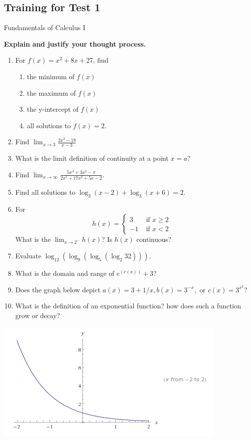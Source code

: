 \documentclass[a4paper, 12pt]{article}
\title{}
\date{}
\newcommand{\bt}[1]{\textbf{#1}} %
\begin{document}
\begin{center}
\section*{Training for Test 1}
Fundamentals of Calculus I\\
\end{center}

\bt{Explain and justify your thought process.}

\begin{enumerate}
    \item For $f(x) = x^2 + 8x +27$, find
    \begin{enumerate}
        \item the minimum of $f(x)$
        \item the maximum of $f(x)$
        \item the y-intercept of $f(x)$
        \item all solutions to $f(x) = 2$.
    \end{enumerate}

    \item Find $\lim_{x \rightarrow 3} \frac{2x^2-18}{x-3}$
    \item What is the limit definition of continuity at a point $x=a$?
    \item Find $\lim_{x \rightarrow \infty} \frac{5x^3 + 3x^2 -\pi}{2x^5 + 17x^2+ 5x -2}$.
    \item Find all solutions to $\log_3(x-2) + \log_3(x+6) =2$.
    \item For
        \begin{displaymath}
           h(x) = \left\{
             \begin{array}{lr}
               3 & \text{ if } x \geq 2 \\
              -1 & \text{ if } x < 2
             \end{array}
           \right.
        \end{displaymath} 
        What is the $\lim_{x \rightarrow 2^-} h(x) $? Is $h(x)$ continuous?
    \item Evaluate $\log_{12}(\log_9(\log_5(\log_2 32)))$.
    \item What is the domain and range of $e^{(e(x))} +3$?
    \item Does the graph below depict $a(x) = 3 + 1/x, b(x) = 3^{-x},$ or $c(x) = 3^{x^2}$?
    \item What is the definition of an exponential function? how does such a function grow or decay? 
\end{enumerate}
    \includegraphics[scale=0.7]{figures/3_negative_x.png}
\end{document}
